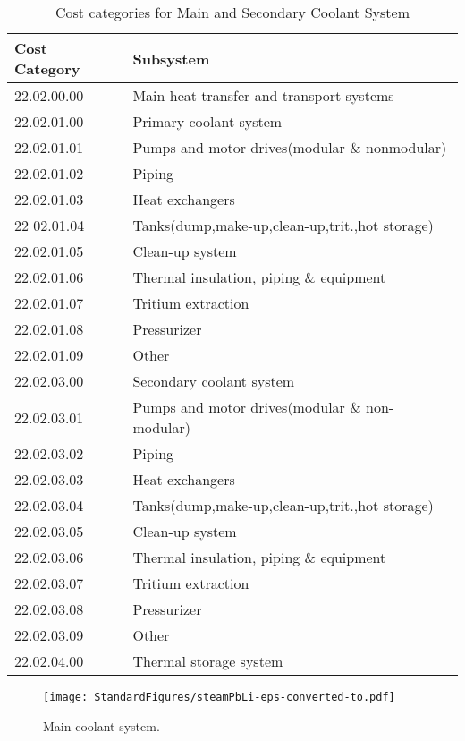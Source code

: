 \begin{table}[h!]   
     \centering   
     \begin{tabular}{l l  }   
     \hline
     Cost Category &   Subsystem				\\
      \hline
 22.02.00.00 &   Main heat transfer and transport systems				\\
 22.02.01.00 &     Primary coolant system				\\
 22.02.01.01 &       Pumps and  motor drives(modular \& nonmodular)				\\
 22.02.01.02 &       Piping				\\
 22.02.01.03 &       Heat exchangers				\\
 22 02.01.04 &       Tanks(dump,make-up,clean-up,trit.,hot storage)		\\		
 22.02.01.05 &       Clean-up system				\\
 22.02.01.06 &       Thermal insulation, piping \& equipment				\\
 22.02.01.07 &       Tritium extraction				\\
 22.02.01.08 &       Pressurizer				\\
 22.02.01.09 &       Other				\\
 22.02.03.00 &     Secondary coolant system				\\
 22.02.03.01 &       Pumps and motor drives(modular \& non-modular)			\\	
 22.02.03.02 &       Piping				\\
 22.02.03.03 &       Heat exchangers				\\
 22.02.03.04 &       Tanks(dump,make-up,clean-up,trit.,hot storage)			\\	
 22.02.03.05 &       Clean-up system				\\
 22.02.03.06 &       Thermal insulation, piping \& equipment				\\
 22.02.03.07 &       Tritium extraction				\\
 22.02.03.08 &       Pressurizer				\\
 22.02.03.09 &       Other				\\
 22.02.04.00 &     Thermal storage system  \\
 \hline
     \end{tabular}  
     \caption{Cost categories for Main and Secondary Coolant System }  
     \label{tab:222}  
 \end{table}   


\begin{figure}[h!]  
\centering  
\texttt{[image: StandardFigures/steamPbLi-eps-converted-to.pdf]}
\caption{Main coolant system.}
\label{fig:coola}
\end{figure} 